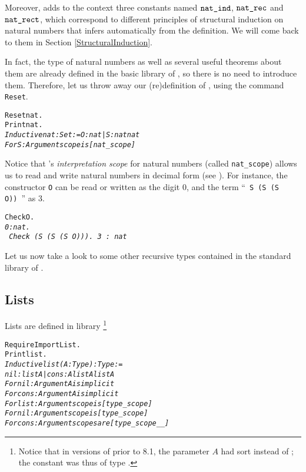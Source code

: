 \documentclass[11pt]{article}
\begin{document}
Moreover, {\coq} adds to the context three constants named
 $\texttt{nat\_ind}$, $\texttt{nat\_rec}$ and $\texttt{nat\_rect}$, which
 correspond to different principles of structural induction on
natural numbers that {\coq} infers automatically from the definition.  We
will come back to them in Section \ref{StructuralInduction}.


In fact, the type of natural numbers as well as several useful
theorems about them are already defined in the basic library of {\coq},
so there is no need to introduce them.  Therefore, let us throw away
our (re)definition of {\nat}, using the command \texttt{Reset}.

\begin{alltt}
Reset nat.
Print nat.
\it{}Inductive nat : Set :=  O : nat | S : nat \arrow{} nat
For S: Argument scope is [nat_scope]
\end{alltt}

Notice that \coq{}'s \emph{interpretation scope} for natural numbers
(called \texttt{nat\_scope}) 
allows us to read and write natural numbers in decimal form (see \cite{coqrefman}). For instance, the constructor \texttt{O} can be read or written
as the digit $0$, and the term ``~\texttt{S (S (S O))}~'' as $3$.

\begin{alltt}
Check O.
\it 0 : nat.
\tt
Check (S (S (S O))).
\it 3 : nat
\end{alltt}

Let us now take a look to some other
recursive types contained in the standard library of {\coq}.

\subsection{Lists}
Lists are defined in library \footnote{Notice that in versions of 
{\coq}
prior to 8.1, the parameter $A$ had sort  instead of ; 
the constant  was thus of type .}


\begin{alltt}
Require Import List.
Print list.
\it
Inductive list (A : Type) : Type:=
    nil : list A | cons : A {\arrow} list A {\arrow} list A
For nil: Argument A is implicit
For cons: Argument A is implicit
For list: Argument scope is [type_scope]
For nil: Argument scope is [type_scope]
For cons: Argument scopes are [type_scope _ _]
\end{alltt}
\end{document}
